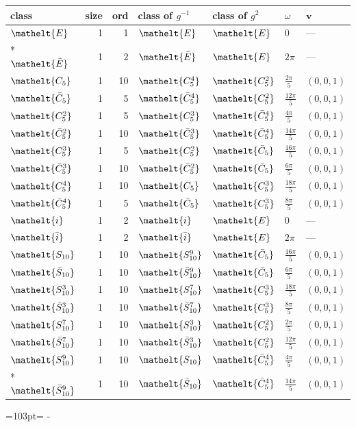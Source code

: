 \documentclass[10pt,a4paper]{article}
\newcommand{\needspace}[1]{\par\penalty-100\begingroup\dimen0=#1\relax\dimen2=\pagegoal
  \advance\dimen2-\pagetotal\ifdim\dimen0>\dimen2\relax\ifdim\dimen2>0pt\vfil\break\fi\fi
  \endgroup}
\numberwithin{equation}{section}
\newcommand{\eltfont}[1]{{\let\sigma\eltsigma\mathelt{#1}}}
\newcommand{\cls}[1]{\eltfont{#1}}
\newcommand{\dirvec}[3]{(#1, #2, #3)}
\newcommand{\vv}{\mathbf{v}}
\newcommand{\barred}[1]{\bar{#1}}
\begin{document}
{\renewcommand{\arraystretch}{1.3}\begin{longtable}{@{}lrrllll@{}}\toprule
class & size & ord & class of $g^{-1}$ & class of $g^{2}$ & $\omega$ & $\vv$\\\midrule\endhead
\bottomrule\endfoot\endlastfoot
$\cls{E}$ & 1 & 1 & $\cls{E}$ & $\cls{E}$ & $0$ & ---\\*
$\cls{\barred{E}}$ & 1 & 2 & $\cls{\barred{E}}$ & $\cls{E}$ & $2\pi$ & ---\\
$\cls{C_{5}}$ & 1 & 10 & $\cls{C_{5}^{4}}$ & $\cls{C_{5}^{2}}$ & $\tfrac{2\pi}{5}$ & $\dirvec{0}{0}{1}$\\
$\cls{\barred{C}_{5}}$ & 1 & 5 & $\cls{\barred{C}_{5}^{4}}$ & $\cls{C_{5}^{2}}$ & $\tfrac{12\pi}{5}$ & $\dirvec{0}{0}{1}$\\
$\cls{C_{5}^{2}}$ & 1 & 5 & $\cls{C_{5}^{3}}$ & $\cls{\barred{C}_{5}^{4}}$ & $\tfrac{4\pi}{5}$ & $\dirvec{0}{0}{1}$\\
$\cls{\barred{C}_{5}^{2}}$ & 1 & 10 & $\cls{\barred{C}_{5}^{3}}$ & $\cls{\barred{C}_{5}^{4}}$ & $\tfrac{14\pi}{5}$ & $\dirvec{0}{0}{1}$\\
$\cls{C_{5}^{3}}$ & 1 & 5 & $\cls{C_{5}^{2}}$ & $\cls{\barred{C}_{5}}$ & $\tfrac{16\pi}{5}$ & $\dirvec{0}{0}{1}$\\
$\cls{\barred{C}_{5}^{3}}$ & 1 & 10 & $\cls{\barred{C}_{5}^{2}}$ & $\cls{\barred{C}_{5}}$ & $\tfrac{6\pi}{5}$ & $\dirvec{0}{0}{1}$\\
$\cls{C_{5}^{4}}$ & 1 & 10 & $\cls{C_{5}}$ & $\cls{C_{5}^{3}}$ & $\tfrac{18\pi}{5}$ & $\dirvec{0}{0}{1}$\\
$\cls{\barred{C}_{5}^{4}}$ & 1 & 5 & $\cls{\barred{C}_{5}}$ & $\cls{C_{5}^{3}}$ & $\tfrac{8\pi}{5}$ & $\dirvec{0}{0}{1}$\\
$\cls{i}$ & 1 & 2 & $\cls{i}$ & $\cls{E}$ & $0$ & ---\\
$\cls{\barred{i}}$ & 1 & 2 & $\cls{\barred{i}}$ & $\cls{E}$ & $2\pi$ & ---\\
$\cls{S_{10}}$ & 1 & 10 & $\cls{S_{10}^{9}}$ & $\cls{\barred{C}_{5}}$ & $\tfrac{16\pi}{5}$ & $\dirvec{0}{0}{1}$\\
$\cls{\barred{S}_{10}}$ & 1 & 10 & $\cls{\barred{S}_{10}^{9}}$ & $\cls{\barred{C}_{5}}$ & $\tfrac{6\pi}{5}$ & $\dirvec{0}{0}{1}$\\
$\cls{S_{10}^{3}}$ & 1 & 10 & $\cls{S_{10}^{7}}$ & $\cls{C_{5}^{3}}$ & $\tfrac{18\pi}{5}$ & $\dirvec{0}{0}{1}$\\
$\cls{\barred{S}_{10}^{3}}$ & 1 & 10 & $\cls{\barred{S}_{10}^{7}}$ & $\cls{C_{5}^{3}}$ & $\tfrac{8\pi}{5}$ & $\dirvec{0}{0}{1}$\\
$\cls{S_{10}^{7}}$ & 1 & 10 & $\cls{S_{10}^{3}}$ & $\cls{C_{5}^{2}}$ & $\tfrac{2\pi}{5}$ & $\dirvec{0}{0}{1}$\\
$\cls{\barred{S}_{10}^{7}}$ & 1 & 10 & $\cls{\barred{S}_{10}^{3}}$ & $\cls{C_{5}^{2}}$ & $\tfrac{12\pi}{5}$ & $\dirvec{0}{0}{1}$\\
$\cls{S_{10}^{9}}$ & 1 & 10 & $\cls{S_{10}}$ & $\cls{\barred{C}_{5}^{4}}$ & $\tfrac{4\pi}{5}$ & $\dirvec{0}{0}{1}$\\*
$\cls{\barred{S}_{10}^{9}}$ & 1 & 10 & $\cls{\barred{S}_{10}}$ & $\cls{\barred{C}_{5}^{4}}$ & $\tfrac{14\pi}{5}$ & $\dirvec{0}{0}{1}$\\
\bottomrule\end{longtable}}
\needspace{103pt}
\end{document}
